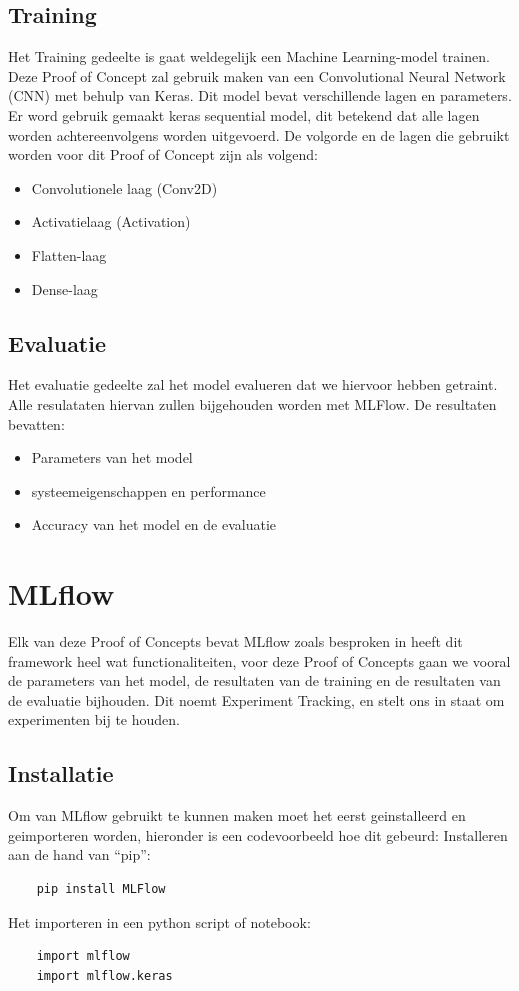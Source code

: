 \subsection{Training}
Het Training gedeelte is gaat weldegelijk een Machine Learning-model trainen. Deze Proof of Concept zal gebruik maken van een Convolutional Neural Network (CNN) met behulp van Keras. Dit model bevat verschillende lagen en parameters.
Er word gebruik gemaakt keras sequential model, dit betekend dat alle lagen worden achtereenvolgens worden uitgevoerd. De volgorde en de lagen die gebruikt worden voor dit Proof of Concept zijn als volgend:
\begin{itemize}
    \item Convolutionele laag (Conv2D)
    \item Activatielaag (Activation)
    \item Flatten-laag
    \item Dense-laag
\end{itemize}
\subsection{Evaluatie}
Het evaluatie gedeelte zal het model evalueren dat we hiervoor hebben getraint. Alle resulataten hiervan zullen bijgehouden worden met MLFlow. De resultaten bevatten:
\begin{itemize}
    \item Parameters van het model
    \item systeemeigenschappen en performance
    \item Accuracy van het model en de evaluatie
\end{itemize}

\section{MLflow}
Elk van deze Proof of Concepts bevat MLflow zoals besproken in heeft dit framework heel wat functionaliteiten, voor deze Proof of Concepts gaan we vooral de parameters van het model, de resultaten van de training en de resultaten van de evaluatie bijhouden.
Dit noemt Experiment Tracking, en stelt ons in staat om experimenten bij te houden.
\subsection{Installatie}
Om van MLflow gebruikt te kunnen maken moet het eerst geinstalleerd en geimporteren worden, hieronder is een codevoorbeeld hoe dit gebeurd:
Installeren aan de hand van ``pip'':
\begin{verbatim}
    pip install MLFlow
\end{verbatim}
Het importeren in een python script of notebook:
\begin{verbatim}
    import mlflow
    import mlflow.keras
\end{verbatim}

